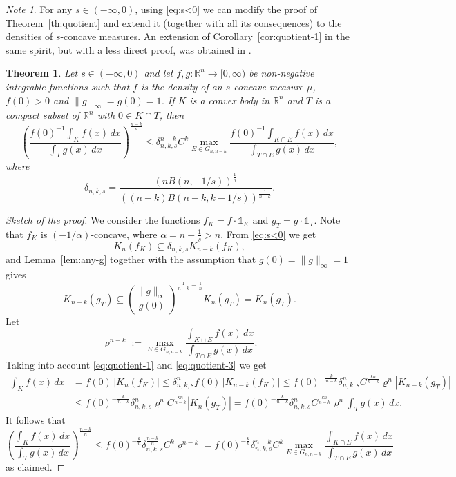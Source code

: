 \documentclass[11pt,leqno]{article}
\newtheorem{theorem}{Theorem}[section]
\theoremstyle{definition}
\theoremstyle{remark}
\newtheorem*{note*}{Note}
\numberwithin{equation}{section}
\newcommand{\ls}{\leqslant}
\newcommand{\1}{\textbf{1}}
\begin{document}
\begin{note*}For any $s\in (-\infty,0)$, using \eqref{eq:s<0} we can modify the proof of Theorem~\ref{th:quotient} and extend it (together
with all its consequences) to the densities of $s$-concave measures. An extension of Corollary~\ref{cor:quotient-1} in the same
spirit, but with a less direct proof, was obtained in \cite{Wu-2020}.
\end{note*}

\begin{theorem}\label{th:quotient-s<0}Let $s\in (-\infty,0)$ and let $f,g:{\mathbb R}^n\to [0,\infty)$ be non-negative integrable functions such that $f$ is the density of an $s$-concave measure $\mu$, $f(0)>0$ and $\|g\|_\infty=g(0)=1$.
If $K$ is a convex body in ${\mathbb R}^n$ and $T$ is a compact subset of ${\mathbb R}^n$ with $0\in K\cap T$, then
\begin{equation}\label{eq:quotient-s<0}
\left(\frac{f(0)^{-1}\int_Kf(x)\,dx}{\int_T g(x)\,dx}\right)^{\frac{n-k}{n}}  \ls \delta_{n,k,s}^{n-k}C^k
\max_{E\in G_{n,n-k}} \frac{f(0)^{-1}\int_{K\cap E} f(x)\,dx}{\int_{T\cap E} g(x)\,dx},
\end{equation}
where
$$\delta_{n,k,s}=\frac{(nB(n,-1/s))^{\frac{1}{n}}}{((n-k)B(n-k,k-1/s))^{\frac{1}{n-k}}}.$$
\end{theorem}

\begin{proof}[Sketch of the proof]We consider the functions $f_K=f\cdot\mathds{1}_K$ and $g_T=g\cdot\mathds{1}_T$.
Note that $f_K$ is $(-1/\alpha)$-concave, where $\alpha =n-\frac{1}{s}>n$.
From \eqref{eq:s<0} we get
\begin{equation}\label{eq:quotient-4-s<0}  K_n(f_K)\subseteq\delta_{n,k,s}K_{n-k}(f_K),\end{equation}
and Lemma~\ref{lem:any-g} together with the assumption that $g(0)=\|g\|_{\infty}=1$ gives
\begin{equation}\label{eq:quotient-5-s<0}K_{n-k}(g_T)\subseteq
\left(\frac{\|g\|_{\infty}}{g(0)}\right)^{\frac{1}{n-k}-\frac{1}{n}}K_{n}(g_T)=K_n(g_T).
\end{equation}
Let $$\varrho^{n-k}:=\max_{E\in G_{n,n-k}} \frac{\int_{K\cap E} f(x)\,dx}{\int_{T\cap E} g(x)\,dx}.$$
Taking into account \eqref{eq:quotient-1} and \eqref{eq:quotient-3} we get
\begin{align*}
\int_Kf(x)\,dx &=f(0)\,|K_n(f_K)|\ls \delta_{n,k,s}^nf(0)\,|K_{n-k}(f_K)|\ls f(0)^{-\frac{k}{n-k}}\delta_{n,k,s}^nC^{\frac{kn}{n-k}}\varrho^{n}|K_{n-k}(g_T)|\\
&\ls f(0)^{-\frac{k}{n-k}}\delta_{n,k,s}^n\varrho^{n}C^{\frac{kn}{n-k}}|K_n(g_T)|= f(0)^{-\frac{k}{n-k}}\delta_{n,k,s}^nC^{\frac{kn}{n-k}}\varrho^{n}
\int_Tg(x)\,dx.
\end{align*}
It follows that
$$\left(\frac{\int_Kf(x)\,dx}{\int_Tg(x)\,dx}\right)^{\frac{n-k}{n}}\ls f(0)^{-\frac{k}{n}}\delta_{n,k,s}^{\frac{n-k}{n}}C^k\varrho^{n-k}
=f(0)^{-\frac{k}{n}}\delta_{n,k,s}^{n-k}C^k\max_{E\in G_{n,n-k}} \frac{\int_{K\cap E} f(x)\,dx}{\int_{T\cap E} g(x)\,dx}$$
as claimed.\end{proof}
\end{document}
